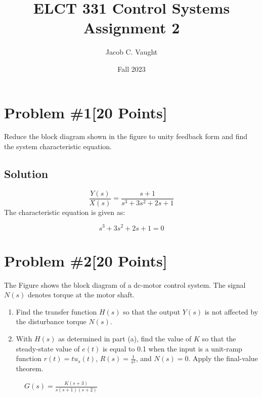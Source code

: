\documentclass{article}
\title{ELCT 331 Control Systems Assignment 2}
\author{Jacob C. Vaught}
\date{Fall 2023}
\begin{document}
\maketitle

\section*{Problem \#1[20 Points]}
Reduce the block diagram shown in the figure to unity feedback form and find the system characteristic equation. 
\newline
\begin{figure}[htbp]
  \centering
  
\end{figure}


\subsection*{Solution}
\[
\frac{Y(s)}{X(s)} = \frac{s+1}{s^3+3s^2+2s+1}
\]
The characteristic equation is given as:

\[
s^3 + 3s^2 + 2s + 1 = 0
\]
\newline
\begin{figure}[htbp]
  \centering
  
\end{figure}

\newpage
\section*{Problem \#2[20 Points]}
The Figure shows the block diagram of a dc-motor control system. The signal \( N(s) \) denotes torque at the motor shaft.

\begin{enumerate}
    \item[a. ] Find the transfer function \( H(s) \) so that the output \( Y(s) \) is not affected by the disturbance torque \( N(s) \).
    \item[b. ] With \( H(s) \) as determined in part (a), find the value of \( K \) so that the steady-state value of \( e(t) \) is equal to 0.1 when the input is a unit-ramp function \( r(t)=tu_s(t) \), \( R(s)=\frac{1}{s^2} \), and \( N(s)=0 \). Apply the final-value theorem.
\end{enumerate}
\newline
\begin{figure}[htbp]
  \centering
  
  \Large \( G(s) = \frac{K(s + 3)}{s(s + 1)(s + 2)} \)
\end{figure}
\end{document}
